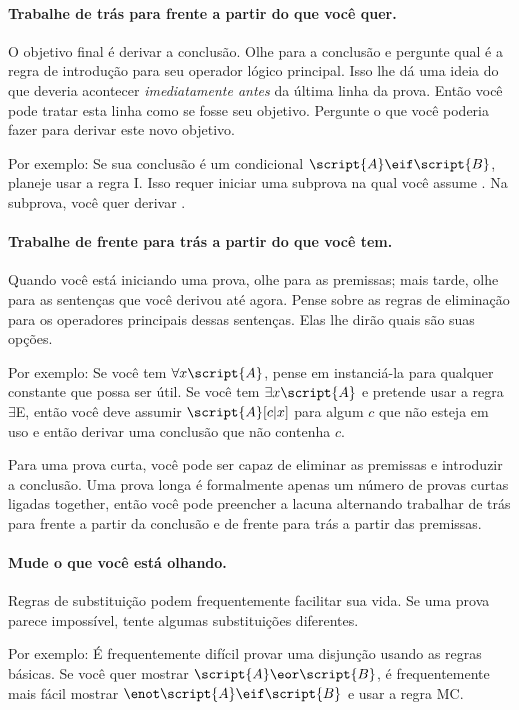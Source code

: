 \paragraph{Trabalhe de trás para frente a partir do que você quer.}
O objetivo final é derivar a conclusão. Olhe para a conclusão e pergunte qual é a regra de introdução para seu operador lógico principal. Isso lhe dá uma ideia do que deveria acontecer \emph{imediatamente antes} da última linha da prova. Então você pode tratar esta linha como se fosse seu objetivo. Pergunte o que você poderia fazer para derivar este novo objetivo.

Por exemplo: Se sua conclusão é um condicional $\script{A}\eif\script{B}$, planeje usar a regra {\eif}I. Isso requer iniciar uma subprova na qual você assume . Na subprova, você quer derivar .

\paragraph{Trabalhe de frente para trás a partir do que você tem.}
Quando você está iniciando uma prova, olhe para as premissas; mais tarde, olhe para as sentenças que você derivou até agora. Pense sobre as regras de eliminação para os operadores principais dessas sentenças. Elas lhe dirão quais são suas opções.

Por exemplo: Se você tem $\forall x\script{A}$, pense em instanciá-la para qualquer constante que possa ser útil. Se você tem $\exists x\script{A}$ e pretende usar a regra $\exists$E, então você deve assumir $\script{A}[c|x]$ para algum $c$ que não esteja em uso e então derivar uma conclusão que não contenha $c$.

Para uma prova curta, você pode ser capaz de eliminar as premissas e introduzir a conclusão. Uma prova longa é formalmente apenas um número de provas curtas ligadas together, então você pode preencher a lacuna alternando trabalhar de trás para frente a partir da conclusão e de frente para trás a partir das premissas.


\paragraph{Mude o que você está olhando.}
Regras de substituição podem frequentemente facilitar sua vida. Se uma prova parece impossível, tente algumas substituições diferentes.

Por exemplo: É frequentemente difícil provar uma disjunção usando as regras básicas. Se você quer mostrar $\script{A}\eor\script{B}$, é frequentemente mais fácil mostrar $\enot\script{A}\eif\script{B}$ e usar a regra MC.

